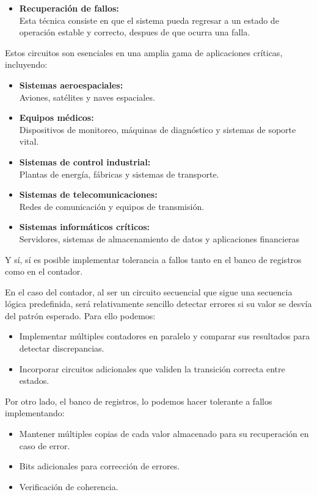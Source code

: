 \documentclass[12pt,letterpaper]{article}
\begin{document}
\begin{enumerate}
\begin{itemize}
    \item \textbf{Recuperación de fallos:}\\
      Esta técnica consiste en que el sistema pueda regresar a un estado de operación estable y correcto, despues de que ocurra una falla.
    \end{itemize}
    
    Estos circuitos son esenciales en una amplia gama de aplicaciones críticas, incluyendo:
    \begin{itemize}
    \item \textbf{Sistemas aeroespaciales:}\\
      Aviones, satélites y naves espaciales.
    \item \textbf{Equipos médicos:}\\
      Dispositivos de monitoreo, máquinas de diagnóstico y sistemas de soporte vital.
    \item \textbf{Sistemas de control industrial:}\\
      Plantas de energía, fábricas y sistemas de transporte.
    \item \textbf{Sistemas de telecomunicaciones:}\\
      Redes de comunicación y equipos de transmisión.
    \item \textbf{Sistemas informáticos críticos:}\\
      Servidores, sistemas de almacenamiento de datos y aplicaciones financieras
    \end{itemize}

    Y sí, sí es posible implementar tolerancia a fallos tanto en el banco de registros como en el contador.
    
    En el caso del contador, al ser un circuito secuencial que sigue una secuencia lógica predefinida, será relativamente sencillo detectar errores si su valor se desvía del patrón esperado. Para ello podemos:

    \begin{itemize}
    \item Implementar múltiples contadores en paralelo y comparar sus resultados para detectar discrepancias.
    \item Incorporar circuitos adicionales que validen la transición correcta entre estados.
    \end{itemize}
    
    Por otro lado, el banco de registros, lo podemos hacer tolerante a fallos implementando:
    
    \begin{itemize}
      \item Mantener múltiples copias de cada valor almacenado para su recuperación en caso de error.
      \item Bits adicionales para corrección de errores.
      \item Verificación de coherencia.
\end{itemize}
    \bigskip
    

\end{enumerate}
\end{document}
